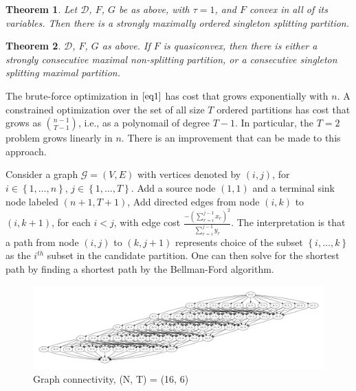 \documentclass{article}
\newtheorem{thm}{Theorem}
\theoremstyle{case}
\begin{document}
\begin{thm} \label{thm2}
Let $\mathcal{D}$, $F$, $G$ be as above, with $\tau = 1$, and $F$ convex in all of its variables. Then there is a strongly maximally ordered singleton splitting partition.
\end{thm}

\begin{thm} \label{thm2} 
$\mathcal{D}$, $F$, $G$ as above. If $F$ is quasiconvex, then there is either a strongly consecutive maximal non-splitting partition, or a consecutive singleton splitting maximal partition.
\end{thm}

The brute-force optimization in $\ref{eq1}$ has cost that grows exponentially with $n$. A constrained optimization over the set of all size $T$ ordered partitions has cost that grows as $\binom{n-1}{T-1}$, i.e., as a polynomail of degree $T-1$. In particular, the $T = 2$ problem grows linearly in $n$. There is an improvement that can be made to this approach.

Consider a graph $\mathcal{G} = \left( V, E\right)$ with vertices denoted by $\left( i, j\right)$, for $i \in \left\lbrace 1, \dots, n\right\rbrace$, $j \in \left\lbrace 1, \dots, T\right\rbrace$. Add a source node $\left( 1, 1\right)$ and a terminal sink node labeled $\left( n+1, T+1\right)$, Add directed edges from node $\left( i,k \right)$ to $\left( i, k+1\right)$, for each $i < j$, with edge cost $\frac{-\left(\sum_{r=i}^{j-1} x_r\right)^2}{\sum_{r=i}^{j-1} y_r}$. The interpretation is that a path from node $\left( i, j\right)$ to $\left( k, j+1\right)$ represents choice of the subset $\left\lbrace i, \dots, k\right\rbrace$ as the $i^{th}$ subset in the candidate partition. One can then solve for the shortest path by finding a shortest path by the Bellman-Ford algorithm. 


% 
\begin{figure}
  \includegraphics[scale=.22]{16_6_unlabeled.pdf}
  \caption{Graph connectivity, (N, T) = (16, 6)}  
\end{figure}
\end{document}
